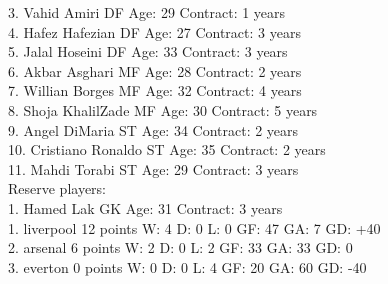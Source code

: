 \documentclass[]{article}
\begin{document}
{3. Vahid Amiri DF Age: 29 Contract: 1 years\\
4. Hafez Hafezian DF Age: 27 Contract: 3 years\\
5. Jalal Hoseini DF Age: 33 Contract: 3 years\\
6. Akbar Asghari MF Age: 28 Contract: 2 years\\
7. Willian Borges MF Age: 32 Contract: 4 years\\
8. Shoja KhalilZade MF Age: 30 Contract: 5 years\\
9. Angel DiMaria ST Age: 34 Contract: 2 years\\
10. Cristiano Ronaldo ST Age: 35 Contract: 2 years\\
11. Mahdi Torabi ST Age: 29 Contract: 3 years\\
Reserve players:\\
1. Hamed Lak GK Age: 31 Contract: 3 years\\
1. liverpool 12 points W: 4 D: 0 L: 0 GF: 47 GA: 7 GD: +40\\
2. arsenal 6 points W: 2 D: 0 L: 2 GF: 33 GA: 33 GD: 0\\
3. everton 0 points W: 0 D: 0 L: 4 GF: 20 GA: 60 GD: -40\\
}
\end{document}
